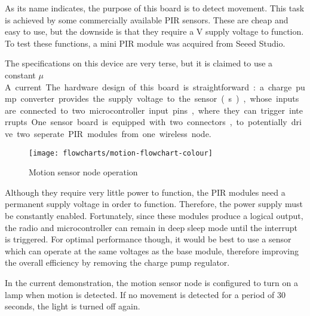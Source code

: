 As its name indicates, the purpose of this board is to detect movement. This
task is achieved by some commercially available PIR sensors. These are cheap and
easy to use, but the downside is that they require a \unit[5]{V} supply voltage
to function. To test these functions, a mini PIR module was acquired from Seeed
Studio.

The specifications on this device are very terse, but it is claimed to use a
constant \unit[50]{$\mu$A} current.

The hardware design of this board is straightforward : a charge pump converter
provides the supply voltage to the sensor(s), whose inputs are connected to two
microcontroller input pins, where they can trigger interrupts. One sensor board
is equipped with two connectors, to potentially drive two seperate PIR modules
from one wireless node.


\begin{figure}[!h]
  \begin{center}
    \texttt{[image: flowcharts/motion-flowchart-colour]}
  \end{center}
  \caption{Motion sensor node operation}
  \label{fig:motion-flowchart}
\end{figure}

Although they require very little power to function, the PIR modules need a
permanent supply voltage in order to function. Therefore, the power supply must
be constantly enabled. Fortunately, since these modules produce a logical
output, the radio and microcontroller can remain in deep sleep mode until the
interrupt is triggered. For optimal performance though, it would be best to use
a sensor which can operate at the same voltages as the base module, therefore
improving the overall efficiency by removing the charge pump regulator.


In the current demonstration, the motion sensor node is configured to turn on a
lamp when motion is detected. If no movement is detected for a period of 30
seconds, the light is turned off again.


